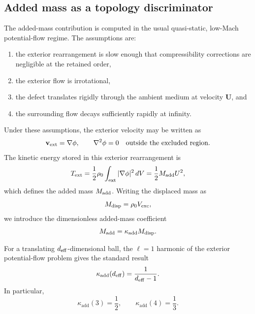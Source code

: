 \documentclass[11pt]{article}
\newcommand{\grad}{\nabla}
\newcommand{\kadd}{\kappa_{\mathrm{add}}}
\begin{document}
\subsection{Added mass as a topology discriminator}
\label{sec:added-mass}

The added-mass contribution is computed in the usual quasi-static, low-Mach potential-flow
regime. The assumptions are:
\begin{enumerate}[leftmargin=1.5em]
  \item the exterior rearrangement is slow enough that compressibility corrections are
  negligible at the retained order,
  \item the exterior flow is irrotational,
  \item the defect translates rigidly through the ambient medium at velocity
  \(\mathbf U\), and
  \item the surrounding flow decays sufficiently rapidly at infinity.
\end{enumerate}
Under these assumptions, the exterior velocity may be written as
\begin{equation}
\mathbf v_{\rm ext}=\grad \phi,
\qquad
\nabla^2 \phi = 0
\quad
\text{outside the excluded region.}
\label{eq:potential-flow-ledger}
\end{equation}
The kinetic energy stored in this exterior rearrangement is
\begin{equation}
T_{\rm ext}
=
\frac12 \rho_0 \int_{\rm ext} |\grad \phi|^2\, dV
=
\frac12 M_{\rm add} U^2,
\label{eq:added-mass-def}
\end{equation}
which defines the added mass \(M_{\rm add}\). Writing the displaced mass as
\begin{equation}
M_{\rm disp}=\rho_0 V_{\rm exc},
\label{eq:displaced-mass}
\end{equation}
we introduce the dimensionless added-mass coefficient
\begin{equation}
M_{\rm add}=\kadd M_{\rm disp}.
\label{eq:kadd-def}
\end{equation}

For a translating \(d_{\rm eff}\)-dimensional ball, the \(\ell=1\) harmonic of the
exterior potential-flow problem gives the standard result
\begin{equation}
\kadd(d_{\rm eff})=\frac{1}{d_{\rm eff}-1}.
\label{eq:kadd-general}
\end{equation}
In particular,
\begin{equation}
\kadd(3)=\frac12,
\qquad
\kadd(4)=\frac13.
\label{eq:kadd-3d-4d}
\end{equation}
\end{document}
